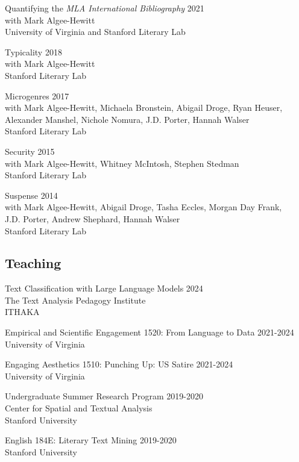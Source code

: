 \documentclass[
  12pt,
  letterpaper,
]{article}
\begin{document}
Quantifying the \emph{MLA International Bibliography} \hfill 2021\\
with Mark Algee-Hewitt\\
University of Virginia and Stanford Literary Lab

Typicality \hfill 2018\\
with Mark Algee-Hewitt\\
Stanford Literary Lab

Microgenres \hfill 2017\\
with Mark Algee-Hewitt, Michaela Bronstein, Abigail
Droge, Ryan Heuser,\\
Alexander Manshel, Nichole Nomura, J.D. Porter, Hannah
Walser\\
Stanford Literary Lab

Security \hfill 2015\\
with Mark Algee-Hewitt, Whitney McIntosh, Stephen
Stedman\\
Stanford Literary Lab

Suspense \hfill 2014\\
with Mark Algee-Hewitt, Abigail Droge, Tasha Eccles,
Morgan Day Frank,\\
J.D. Porter, Andrew Shephard, Hannah Walser\\
Stanford Literary Lab

\hypertarget{teaching}{%
\subsection{Teaching}\label{teaching}}

Text Classification with Large Language Models \hfill 2024\\
The Text Analysis Pedagogy Institute\\
ITHAKA

Empirical and Scientific Engagement 1520: From Language to Data
\hfill 2021-2024\\
University of Virginia

Engaging Aesthetics 1510: Punching Up: US Satire \hfill 2021-2024\\
University of Virginia

Undergraduate Summer Research Program \hfill 2019-2020\\
Center for Spatial and Textual Analysis\\
Stanford University

English 184E: Literary Text Mining \hfill 2019-2020\\
Stanford University
\end{document}
